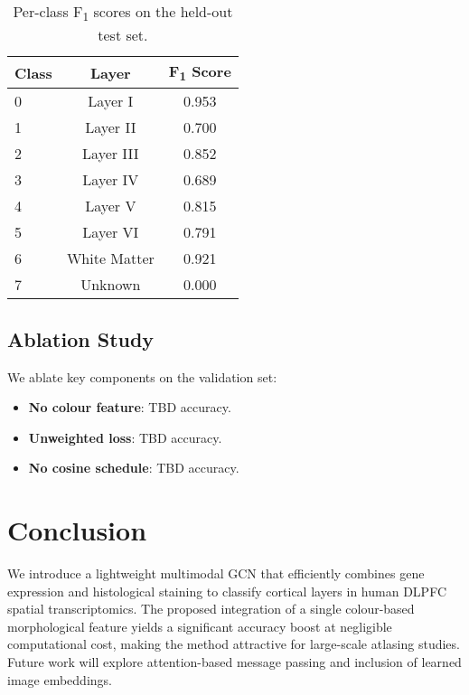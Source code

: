 \documentclass[conference]{IEEEtran}
\begin{document}
\begin{table}[H]
  \centering
  \caption{Per-class F\textsubscript{1} scores on the held-out test set.}
  \label{tab:perclass_f1}
  \begin{tabular}{lcc}
    \toprule
    Class & Layer & F\textsubscript{1} Score \\ \midrule
    0 & Layer I & 0.953 \\
    1 & Layer II & 0.700 \\
    2 & Layer III & 0.852 \\
    3 & Layer IV & 0.689 \\
    4 & Layer V & 0.815 \\
    5 & Layer VI & 0.791 \\
    6 & White Matter & 0.921 \\
    7 & Unknown & 0.000 \\ \bottomrule
  \end{tabular}
\end{table}

\subsection{Ablation Study}
We ablate key components on the validation set:
\begin{itemize}
    \item \textbf{No colour feature}: TBD accuracy.
    \item \textbf{Unweighted loss}: TBD accuracy.
    \item \textbf{No cosine schedule}: TBD accuracy.
\end{itemize}

\section{Conclusion}
We introduce a lightweight multimodal GCN that efficiently combines gene 
expression and histological staining to classify cortical layers in human DLPFC 
spatial transcriptomics. The proposed integration of a single colour-based 
morphological feature yields a significant accuracy boost at negligible 
computational cost, making the method attractive for large-scale atlasing 
studies. Future work will explore attention-based message passing and inclusion 
of learned image embeddings.

\end{document}
